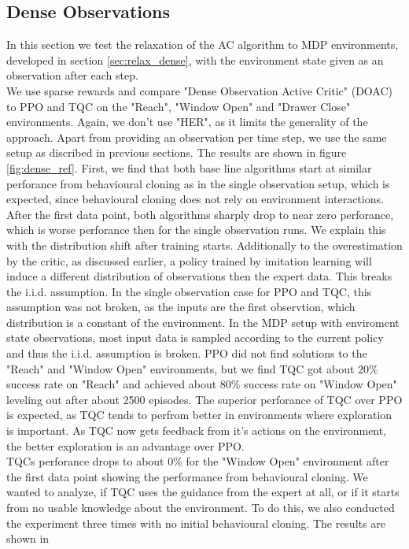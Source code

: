 \subsection{Dense Observations}
In this section we test the relaxation of the AC algorithm to MDP environments, developed in section \ref{sec:relax_dense}, with the environment state given as an observation after each step. \\
We use sparse rewards 
and compare "Dense Observation Active Critic" (DOAC) to PPO and TQC on the "Reach", "Window Open" and "Drawer Close" environments. Again, we don't use "HER", as it limits the generality of 
the approach. Apart from 
providing an observation per time step,
we use the same setup as discribed in previous sections. The results are shown in figure \ref{fig:dense_ref}. First, we find that both base line algorithms 
start at similar perforance from behavioural cloning as in the single observation setup, which is expected, since behavioural cloning does not rely on 
environment interactions. After the first data point, both algorithms sharply drop to near zero perforance, which is worse perforance then for the single 
observation runs. We explain this with the distribution shift after training starts. Additionally to the overestimation by the critic, as discussed earlier, a policy trained by imitation learning 
will induce a different distribution of observations then the expert data. This breaks the i.i.d. assumption. In the single observation case for PPO and TQC, this assumption was not broken, 
as the inputs are the first observtion, which distribution is a constant of the environment. In the MDP setup with enviroment state observations, most input data is 
sampled according to the current policy and thus the i.i.d. assumption is broken. PPO did not find solutions to the "Reach" and "Window Open" environments, 
but we find TQC got about $20 \%$ success rate on "Reach" and achieved about $80 \%$ success rate on "Window Open" leveling out after about 2500 episodes. 
The superior perforance of TQC over PPO is expected, as TQC tends to perfrom better in environments where exploration is important. As TQC now gets 
feedback from it's actions on the environment, the better exploration is an advantage over PPO.\\ 
TQCs perforance drops to about $0 \%$ for the "Window Open" 
environment after the first data point showing the performance from behavioural cloning. We wanted to analyze, if TQC uses the guidance from the expert at all, or if it starts from 
no usable knowledge about the environment. To do this, we also conducted the experiment three times with no initial behavioural cloning. The results are shown in 
